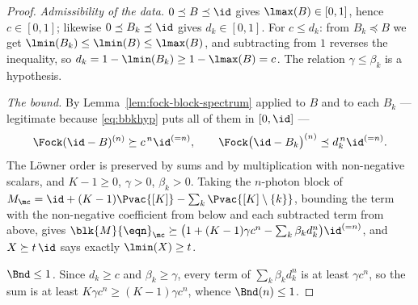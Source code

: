 \begin{proof}
\emph{Admissibility of the data.} $0\preceq B\preceq\id$ gives
$\lmax(B)\in[0,1]$, hence $c\in[0,1]$; likewise $0\preceq B_k\preceq\id$ gives
$d_k\in[0,1]$. For $c\le d_k$: from $B_k\preceq B$ we get
$\lmin(B_k)\le\lmin(B)\le\lmax(B)$, and subtracting from $1$ reverses the
inequality, so $d_k=1-\lmin(B_k)\ge1-\lmax(B)=c$. The relation
$\gamma\le\beta_k$ is a hypothesis.

\emph{The bound.} By Lemma~\ref{lem:fock-block-spectrum} applied to $B$ and to each
$B_k$ --- legitimate because \eqref{eq:bbkhyp} puts all of them in
$[0,\id]$ ---
\begin{equation}\label{eq:blockopbounds}
  \Fock(\id-B)^{(n)}\succeq c^{\,n}\id^{(=n)},
  \qquad
  \Fock\big(\id-B_k\big)^{(n)}\preceq d_k^{\,n}\id^{(=n)} .
\end{equation}
The Löwner order is preserved by sums and by multiplication with non-negative
scalars, and $K-1\ge0$, $\gamma>0$, $\beta_k>0$. Taking the $n$-photon block of
$M_{\mc}=\id+(K-1)\Pvac{[K]}-\sum_k\Pvac{[K]\setminus\{k\}}$, bounding the
term with the non-negative coefficient from below and each subtracted term from
above, gives
$\blk{M}{\eqn}_{\mc}\succeq\big(1+(K-1)\gamma c^n-\sum_k\beta_kd_k^n\big)
\id^{(=n)}$, and $X\succeq t\,\id$ says exactly $\lmin(X)\ge t$.

\emph{$\Bnd\le1$.} Since $d_k\ge c$ and $\beta_k\ge\gamma$, every term of
$\sum_k\beta_kd_k^n$ is at least $\gamma c^n$, so the sum is at least
$K\gamma c^n\ge(K-1)\gamma c^n$, whence $\Bnd(n)\le1$.
\end{proof}
